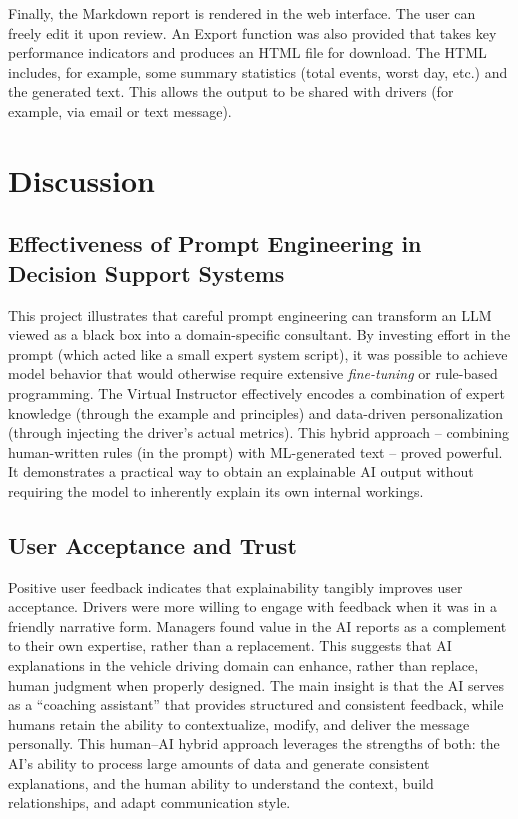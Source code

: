 \documentclass[12pt]{article}
\begin{document}
Finally, the Markdown report is rendered in the web interface. The user can freely edit it upon review. An Export function was also provided that takes key performance indicators and produces an HTML file for download. The HTML includes, for example, some summary statistics (total events, worst day, etc.) and the generated text. This allows the output to be shared with drivers (for example, via email or text message).

\section{Discussion}

\subsection{Effectiveness of Prompt Engineering in Decision Support Systems}

This project illustrates that careful prompt engineering can transform an LLM viewed as a black box into a domain-specific consultant. By investing effort in the prompt (which acted like a small expert system script), it was possible to achieve model behavior that would otherwise require extensive \textit{fine-tuning} or rule-based programming. The Virtual Instructor effectively encodes a combination of expert knowledge (through the example and principles) and data-driven personalization (through injecting the driver’s actual metrics). This hybrid approach – combining human-written rules (in the prompt) with ML-generated text – proved powerful. It demonstrates a practical way to obtain an explainable AI output without requiring the model to inherently explain its own internal workings.

\subsection{User Acceptance and Trust}

Positive user feedback indicates that explainability tangibly improves user acceptance. Drivers were more willing to engage with feedback when it was in a friendly narrative form. Managers found value in the AI reports as a complement to their own expertise, rather than a replacement. This suggests that AI explanations in the vehicle driving domain can enhance, rather than replace, human judgment when properly designed. The main insight is that the AI serves as a “coaching assistant” that provides structured and consistent feedback, while humans retain the ability to contextualize, modify, and deliver the message personally. This human–AI hybrid approach leverages the strengths of both: the AI’s ability to process large amounts of data and generate consistent explanations, and the human ability to understand the context, build relationships, and adapt communication style.
\end{document}
